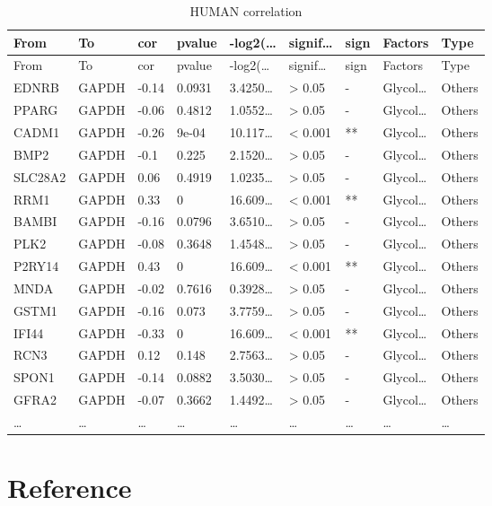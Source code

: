 \documentclass[
]{article}
\begin{document}
\begin{longtable}[]{@{}lllllllll@{}}
\caption{\label{tab:HUMAN-correlation}HUMAN correlation}\tabularnewline
\toprule
From & To & cor & pvalue & -log2(\ldots{} & signif\ldots{} & sign & Factors & Type\tabularnewline
\midrule
\endfirsthead
\toprule
From & To & cor & pvalue & -log2(\ldots{} & signif\ldots{} & sign & Factors & Type\tabularnewline
\midrule
\endhead
EDNRB & GAPDH & -0.14 & 0.0931 & 3.4250\ldots{} & \textgreater{} 0.05 & - & Glycol\ldots{} & Others\tabularnewline
PPARG & GAPDH & -0.06 & 0.4812 & 1.0552\ldots{} & \textgreater{} 0.05 & - & Glycol\ldots{} & Others\tabularnewline
CADM1 & GAPDH & -0.26 & 9e-04 & 10.117\ldots{} & \textless{} 0.001 & ** & Glycol\ldots{} & Others\tabularnewline
BMP2 & GAPDH & -0.1 & 0.225 & 2.1520\ldots{} & \textgreater{} 0.05 & - & Glycol\ldots{} & Others\tabularnewline
SLC28A2 & GAPDH & 0.06 & 0.4919 & 1.0235\ldots{} & \textgreater{} 0.05 & - & Glycol\ldots{} & Others\tabularnewline
RRM1 & GAPDH & 0.33 & 0 & 16.609\ldots{} & \textless{} 0.001 & ** & Glycol\ldots{} & Others\tabularnewline
BAMBI & GAPDH & -0.16 & 0.0796 & 3.6510\ldots{} & \textgreater{} 0.05 & - & Glycol\ldots{} & Others\tabularnewline
PLK2 & GAPDH & -0.08 & 0.3648 & 1.4548\ldots{} & \textgreater{} 0.05 & - & Glycol\ldots{} & Others\tabularnewline
P2RY14 & GAPDH & 0.43 & 0 & 16.609\ldots{} & \textless{} 0.001 & ** & Glycol\ldots{} & Others\tabularnewline
MNDA & GAPDH & -0.02 & 0.7616 & 0.3928\ldots{} & \textgreater{} 0.05 & - & Glycol\ldots{} & Others\tabularnewline
GSTM1 & GAPDH & -0.16 & 0.073 & 3.7759\ldots{} & \textgreater{} 0.05 & - & Glycol\ldots{} & Others\tabularnewline
IFI44 & GAPDH & -0.33 & 0 & 16.609\ldots{} & \textless{} 0.001 & ** & Glycol\ldots{} & Others\tabularnewline
RCN3 & GAPDH & 0.12 & 0.148 & 2.7563\ldots{} & \textgreater{} 0.05 & - & Glycol\ldots{} & Others\tabularnewline
SPON1 & GAPDH & -0.14 & 0.0882 & 3.5030\ldots{} & \textgreater{} 0.05 & - & Glycol\ldots{} & Others\tabularnewline
GFRA2 & GAPDH & -0.07 & 0.3662 & 1.4492\ldots{} & \textgreater{} 0.05 & - & Glycol\ldots{} & Others\tabularnewline
\ldots{} & \ldots{} & \ldots{} & \ldots{} & \ldots{} & \ldots{} & \ldots{} & \ldots{} & \ldots{}\tabularnewline
\bottomrule
\end{longtable}

\hypertarget{bibliography}{%
\section*{Reference}\label{bibliography}}
\end{document}

